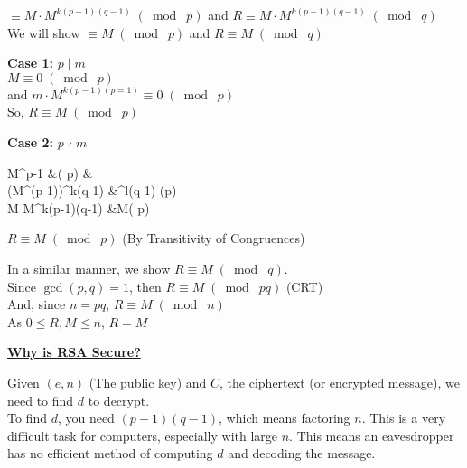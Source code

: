 \documentclass{letter}
\begin{document}
	$ \equiv  M \cdot M^{k(p-1)(q-1)}\;(\bmod\; p)$ and $R \equiv M \cdot M^{k(p-1)(q-1)}\;(\bmod\; q)$\\
	
	We will show $ \equiv M\;(\bmod\; p)$ and $R \equiv M\;(\bmod\; q)$\\
	
	\begin{minipage}[t]{0.5\textwidth}
		\textbf{Case 1:} $p \mid m$\\
		$M \equiv 0\;(\bmod\; p)$\\
		and $m \cdot M^{k(p-1)(p=1)} \equiv 0 \;(\bmod\; p)$\\
		So, $R \equiv M\;(\bmod\; p)$\\
	\end{minipage}
	\begin{minipage}[t]{0.5\textwidth}
		\textbf{Case 2:} $p \nmid m$
		\begin{flalign*}
		M^{p-1} &\;(\bmod\; p) &\\
		(M^{(p-1)})^{k(q-1)} &^{l(q-1)} \;(\bmod p)\\
		M \cdot M^{k(p-1)(q-1)} &\equiv M\;(\bmod\; p)
		\end{flalign*}
		$R \equiv M \;(\bmod\; p)$ (By Transitivity of Congruences)
	\end{minipage}
	
	In a similar manner, we show $R \equiv M\;(\bmod\; q)$.\\
	
	Since $\gcd(p, q) = 1$, then $R \equiv M\;(\bmod\; pq)$ (CRT)\\
	
	And, since $n=pq$, $R \equiv M\;(\bmod\; n)$\\
	
	As $0 \leq R, M \leq n$, $R=M$\\
	\pagebreak
	
	\underline{\textbf{Why is RSA Secure?}}
	
	Given $(e, n)$ (The public key) and $C$, the ciphertext (or encrypted message), we need to find $d$ to decrypt.\\
	To find $d$, you need $(p-1)(q-1)$, which means factoring $n$. This is a very difficult task for computers, especially with large $n$. This means an eavesdropper has no efficient method of computing $d$ and decoding the message.
\end{document}
